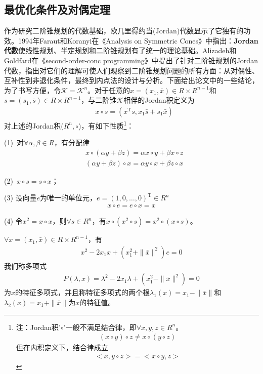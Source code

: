     \subsection{最优化条件及对偶定理}
        \par
        作为研究二阶锥规划的代数基础，欧几里得约当(Jordan)代数显示了它独有的功效。1994年Faraut和Koranyi在《Analysis on Symmetric Cones》中指出：\textbf{Jordan代数}使线性规划、半定规划和二阶锥规划有了统一的理论基础。Alizadeh和Goldfard在《second-order-conc programming》中提出了针对二阶锥规划的Jordan代数，指出对它们的理解可使人们观察到二阶锥规划问题的所有方面：从对偶性、互补性到非退化条件，最终到内点法的设计与分析。下面给出论文中的一些结论，为了书写方便，令$\mathcal{K}=\mathcal{K}^n$。对于任意的$x=(x_1,\bar{x})\in R\times R^{n-1}$和$s=(s_1,\bar{s})\in R\times R^{n-1}$，与二阶锥$\mathcal{K}$相伴的Jordan积定义为
        \begin{align*}
          & x \circ s=(x^\mathrm{T} s,x_1\bar{s}+s_1\bar{x})
        \end{align*}
        对上述的Jordan积($R^n,\circ$)，有如下性质\footnote{
        注：Jordan积'$\circ$'一般不满足结合律，即$\forall x,y,z\in R^n$。
        \begin{align*}
          (x\circ y)\circ z \neq x\circ (y\circ z)
        \end{align*}
        但在内积定义下，结合律成立
        \begin{align*}
          \big< {x, y\circ z} \big> = \big<{x\circ y,z} \big>
        \end{align*}
        }：\par
        (1)\ 对$\forall \alpha,\beta \in R$，有分配律
        \begin{align*}
          & x \circ (\alpha y+\beta z)=\alpha x\circ y+\beta x\circ z\\
          & (\alpha y+\beta z)\circ x=\alpha y\circ x+\beta z \circ x
        \end{align*}
        \par
        (2)\ $x\circ s=s\circ x$；\par
        (3) 设向量$e$为唯一的单位元，$e=(1,0,\ldots,0)^\mathrm{T} \in R^n$
        \begin{align*}
          x\circ e=e\circ x=x
        \end{align*}
        \par
        (4) 令$x^2=x \circ x$，则$\forall s \in R^n$，有$x\circ (x^2\circ s)=x^2\circ (x\circ s)$。
        \par
        \begin{definition}[向量特征值]
        $\forall x=(x_1,\bar{x})\in R\times R^{n-1}$，有
        \begin{align*}
          x^2-2x_1x+(x_1^2+\|\bar{x}\|^2)e=0
        \end{align*}
        我们称多项式
        \begin{align*}
          P(\lambda,x)={\lambda}^2-2x_1\lambda+(x_1^2-\|\bar{x}\|^2)=0
        \end{align*}
        为$x$的特征多项式，并且称特征多项式的两个根${\lambda}_{1}(x)=x_1-\|\bar{x}\|$和${\lambda}_{2}(x)=x_1+\|\bar{x}\|$为$x$的特征值。
        \end{definition}
